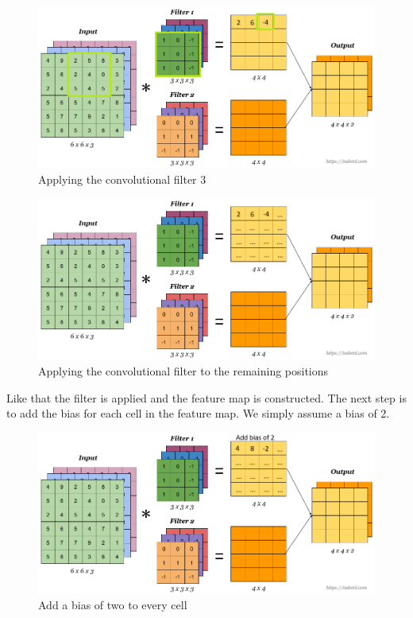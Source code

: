 \documentclass[a4paper,12pt]{report}
\begin{document}
\begin{figure}[htbp]
  \centering
  \includegraphics[width=\textwidth]{images/CNN_filters_2.png}
  \caption{Applying the convolutional filter 3}
  \label{fig:fullwidth}
\end{figure}

\begin{figure}[htbp]
  \centering
  \includegraphics[width=\textwidth]{images/CNN_filters_3.png}
  \caption{Applying the convolutional filter to the remaining positions}
  \label{fig:fullwidth}
\end{figure}
\FloatBarrier
Like that the filter is applied and the feature map is constructed. The next step is to add the bias for each cell in the feature map. We simply assume a bias of 2.

\begin{figure}[htbp]
  \centering
  \includegraphics[width=\textwidth]{images/CNN_filters_3_5.png}
  \caption{Add a bias of two to every cell}
  \label{fig:fullwidth}
\end{figure}
\end{document}
